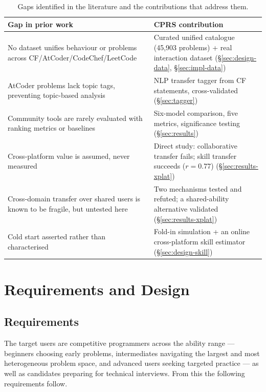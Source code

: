 \documentclass[12pt,a4paper]{article}
\begin{document}
\begin{table}[h]
\centering
\caption{Gaps identified in the literature and the contributions that address them.}
\label{tab:gap}
\small
\begin{tabularx}{\textwidth}{@{}p{5.4cm}X@{}}
\toprule
\textbf{Gap in prior work} & \textbf{CPRS contribution} \\
\midrule
No dataset unifies behaviour or problems across CF/AtCoder/CodeChef/LeetCode & Curated
unified catalogue (45{,}903 problems) + real interaction dataset (\S\ref{sec:design-data},
\S\ref{sec:impl-data}) \\
AtCoder problems lack topic tags, preventing topic-based analysis & NLP transfer tagger
from CF statements, cross-validated (\S\ref{sec:tagger}) \\
Community tools are rarely evaluated with ranking metrics or baselines & Six-model
comparison, five metrics, significance testing (\S\ref{sec:results}) \\
Cross-platform value is assumed, never measured & Direct study: collaborative transfer
fails; skill transfer succeeds ($r=0.77$) (\S\ref{sec:results-xplat}) \\
Cross-domain transfer over shared users is known to be fragile, but untested here &
Two mechanisms tested and refuted; a shared-ability alternative validated
(\S\ref{sec:results-xplat}) \\
Cold start asserted rather than characterised & Fold-in simulation + an online
cross-platform skill estimator (\S\ref{sec:design-skill}) \\
\bottomrule
\end{tabularx}
\end{table}

\section[Requirements and Design \textnormal{\small(1,614 words)}]{Requirements and Design}
\label{sec:design}

\subsection{Requirements}
\label{sec:requirements}
The target users are competitive programmers across the ability range --- beginners
choosing early problems, intermediates navigating the largest and most heterogeneous
problem space, and advanced users seeking targeted practice --- as well as candidates
preparing for technical interviews. From this the following requirements follow.
\end{document}
